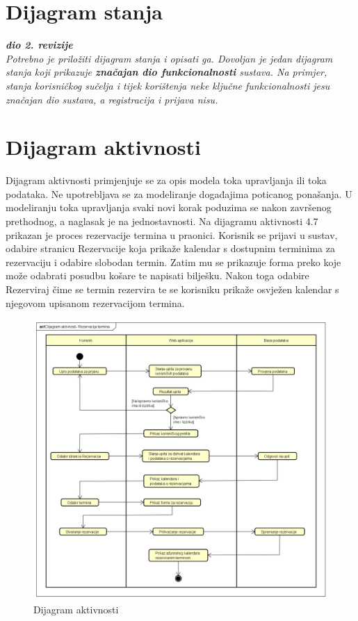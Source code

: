 			\pagebreak
 			
 			
		\section{Dijagram stanja}
			
			
			\textbf{\textit{dio 2. revizije}}\\
			
			\textit{Potrebno je priložiti dijagram stanja i opisati ga. Dovoljan je jedan dijagram stanja koji prikazuje \textbf{značajan dio funkcionalnosti} sustava. Na primjer, stanja korisničkog sučelja i tijek korištenja neke ključne funkcionalnosti jesu značajan dio sustava, a registracija i prijava nisu. }
			
			
			\eject 
		
		\section{Dijagram aktivnosti}
		
		Dijagram aktivnosti primjenjuje se za opis modela toka upravljanja ili toka podataka. Ne upotrebljava se za modeliranje događajima poticanog ponašanja. U modeliranju toka upravljanja svaki novi korak poduzima se nakon završenog prethodnog, a naglasak je na jednostavnosti. Na dijagramu aktivnosti 4.7 prikazan je
		proces rezervacije termina u praonici. Korisnik se prijavi u sustav, odabire stranicu Rezervacije koja prikaže kalendar s dostupnim terminima za rezervaciju i odabire slobodan termin. Zatim mu se prikazuje forma preko koje može odabrati posudbu košare te napisati bilješku. Nakon toga odabire Rezerviraj čime se termin rezervira te se korisniku prikaže osvježen kalendar s njegovom upisanom rezervacijom termina.

		
				\begin{figure}[H]
				\includegraphics[width=1\linewidth]{slike/Dijagram aktivnosti.png}
				\centering
				\caption{Dijagram aktivnosti}
				\label{fig:dijagram_aktivnosti}
			\end{figure}
			\eject
